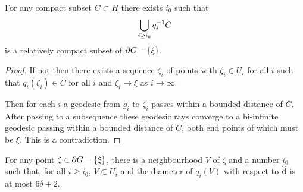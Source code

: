 \documentclass[a4paper]{article}
\begin{document}
\begin{lemma}\label{lem:propermaps} 
  For any compact subset $C \subset H$ there exists $i_0$ such that
  \begin{equation*}
    \bigcup_{i\geq i_0} q_i^{-1} C
  \end{equation*}
  is a relatively compact subset of $\partial G - \left\{\xi\right\}$.
\end{lemma}

\begin{proof}
  If not then there exists a sequence $\zeta_i$ of points with $\zeta_i \in U_i$ 
  for all $i$ such that $q_i(\zeta_i) \in C$ for all $i$ and $\zeta_i \to \xi$ 
  as $i \to \infty$.

  Then for each $i$ a geodesic from $g_i$ to $\zeta_i$ passes within a bounded
  distance of $C$. After passing to a subsequence these geodesic rays converge
  to a bi-infinite geodesic passing within a bounded distance of $C$, both end
  points of which must be $\xi$. This is a contradiction.
\end{proof}

\begin{lemma}\label{lem:uniform_continuity}
  For any point $\zeta \in \partial G - \left\{\xi\right\}$, there is a neighbourhood $V$
  of $\zeta$ and a number $i_0$ such that, for all $i \geq i_0$, $V \subset U_i$ 
  and the diameter of $q_i(V)$ with respect to $\operatorname{\widehat{d}}$ is at most $6\delta+2$.
\end{lemma}
\end{document}
